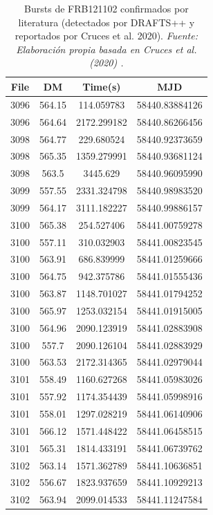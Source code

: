 \begin{table}[H]
    \centering
    \caption{Bursts de FRB121102 confirmados por literatura (detectados por DRAFTS++ y reportados por Cruces et al. 2020). \textit{Fuente: Elaboración propia basada en Cruces et al. (2020) \cite{cruces2020frb121102}.}}
    \label{tab:confirmed_bursts}
    \begin{tabular}{|c|c|c|c|}
        \hline
        \textbf{File} & \textbf{DM} & \textbf{Time(s)} & \textbf{MJD} \\
        \hline
        3096 & 564.15 & 114.059783 & 58440.83884126 \\
        3096 & 564.64 & 2172.299182 & 58440.86266456 \\
        3098 & 564.77 & 229.680524 & 58440.92373659 \\
        3098 & 565.35 & 1359.279991 & 58440.93681124 \\
        3098 & 563.5 & 3445.629 & 58440.96095990 \\
        3099 & 557.55 & 2331.324798 & 58440.98983520 \\
        3099 & 564.17 & 3111.182227 & 58440.99886157 \\
        3100 & 565.38 & 254.527406 & 58441.00759278 \\
        3100 & 557.11 & 310.032903 & 58441.00823545 \\
        3100 & 563.91 & 686.839999 & 58441.01259666 \\
        3100 & 564.75 & 942.375786 & 58441.01555436 \\
        3100 & 563.87 & 1148.701027 & 58441.01794252 \\
        3100 & 565.97 & 1253.032154 & 58441.01915005 \\
        3100 & 564.96 & 2090.123919 & 58441.02883908 \\
        3100 & 557.7 & 2090.126104 & 58441.02883929 \\
        3100 & 563.53 & 2172.314365 & 58441.02979044 \\
        3101 & 558.49 & 1160.627268 & 58441.05983026 \\
        3101 & 557.92 & 1174.354439 & 58441.05998916 \\
        3101 & 558.01 & 1297.028219 & 58441.06140906 \\
        3101 & 566.12 & 1571.448422 & 58441.06458515 \\
        3101 & 565.31 & 1814.433191 & 58441.06739762 \\
        3102 & 563.14 & 1571.362789 & 58441.10636851 \\
        3102 & 556.67 & 1823.937659 & 58441.10929213 \\
        3102 & 563.94 & 2099.014533 & 58441.11247584 \\
        \hline
    \end{tabular}
\end{table}

